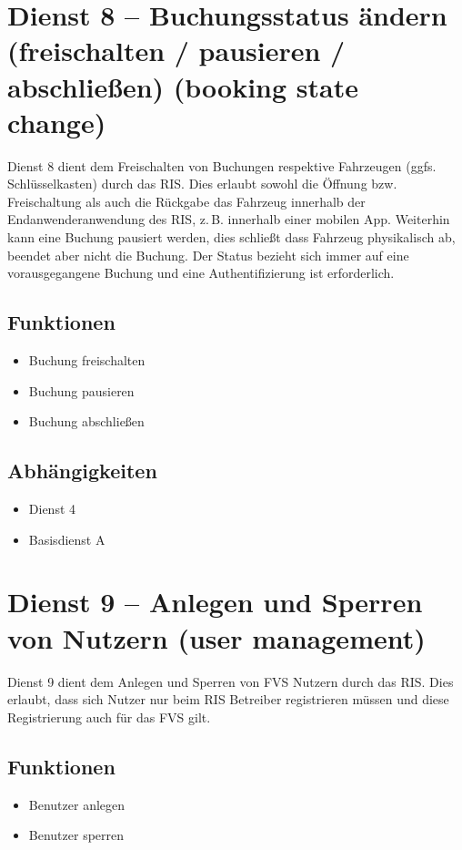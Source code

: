 \section{Dienst 8 -- Buchungsstatus ändern (freischalten / pausieren / abschließen) (booking state change)}
Dienst 8 dient dem Freischalten von Buchungen respektive Fahrzeugen (ggfs. Schlüsselkasten) durch das RIS. Dies erlaubt sowohl die Öffnung bzw. Freischaltung als auch die Rückgabe das Fahrzeug innerhalb der Endanwenderanwendung des RIS, z.\,B. innerhalb einer mobilen App. Weiterhin kann eine Buchung pausiert werden, dies schließt dass Fahrzeug physikalisch ab, beendet aber nicht die Buchung.
Der Status bezieht sich immer auf eine vorausgegangene Buchung und eine Authentifizierung ist erforderlich.

\subsection*{Funktionen}
\begin{itemize}
\item Buchung freischalten
\item Buchung pausieren
\item Buchung abschließen
\end{itemize}

\subsection*{Abhängigkeiten}
\begin{itemize}
\item Dienst 4
\item Basisdienst A
\end{itemize}

\section{Dienst 9 -- Anlegen und Sperren von Nutzern (user management)}
Dienst 9 dient dem Anlegen und Sperren von FVS Nutzern durch das RIS. Dies erlaubt, dass sich Nutzer nur beim RIS Betreiber registrieren müssen und diese Registrierung auch für das FVS gilt.

\subsection*{Funktionen}
\begin{itemize}
\item Benutzer anlegen
\item Benutzer sperren
\end{itemize}

